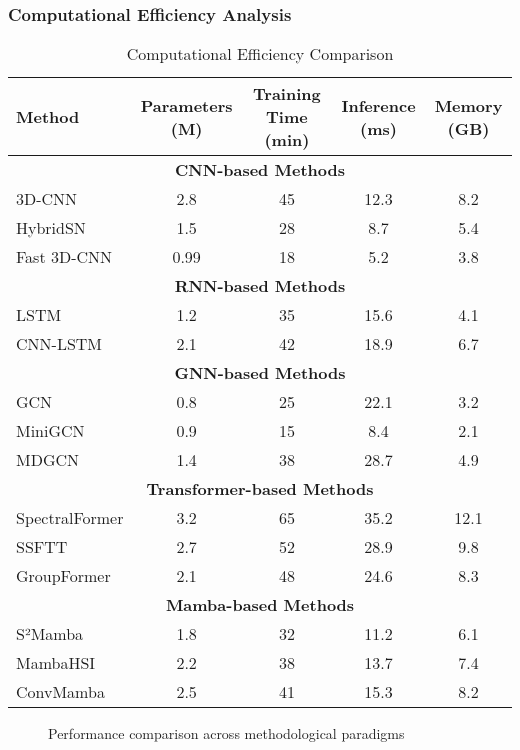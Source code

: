\documentclass[journal]{IEEEtran}
\begin{document}
\subsubsection{Computational Efficiency Analysis}

\begin{table}[!t]
\renewcommand{\arraystretch}{1.3}
\caption{Computational Efficiency Comparison}
\label{tab:efficiency_comparison}
\centering
\begin{tabular}{|l|c|c|c|c|}
\hline
\textbf{Method} & \textbf{Parameters (M)} & \textbf{Training Time (min)} & \textbf{Inference (ms)} & \textbf{Memory (GB)} \\
\hline
\multicolumn{5}{|c|}{\textbf{CNN-based Methods}} \\
\hline
3D-CNN & 2.8 & 45 & 12.3 & 8.2 \\
HybridSN & 1.5 & 28 & 8.7 & 5.4 \\
Fast 3D-CNN & 0.99 & 18 & 5.2 & 3.8 \\
\hline
\multicolumn{5}{|c|}{\textbf{RNN-based Methods}} \\
\hline
LSTM & 1.2 & 35 & 15.6 & 4.1 \\
CNN-LSTM & 2.1 & 42 & 18.9 & 6.7 \\
\hline
\multicolumn{5}{|c|}{\textbf{GNN-based Methods}} \\
\hline
GCN & 0.8 & 25 & 22.1 & 3.2 \\
MiniGCN & 0.9 & 15 & 8.4 & 2.1 \\
MDGCN & 1.4 & 38 & 28.7 & 4.9 \\
\hline
\multicolumn{5}{|c|}{\textbf{Transformer-based Methods}} \\
\hline
SpectralFormer & 3.2 & 65 & 35.2 & 12.1 \\
SSFTT & 2.7 & 52 & 28.9 & 9.8 \\
GroupFormer & 2.1 & 48 & 24.6 & 8.3 \\
\hline
\multicolumn{5}{|c|}{\textbf{Mamba-based Methods}} \\
\hline
S²Mamba & 1.8 & 32 & 11.2 & 6.1 \\
MambaHSI & 2.2 & 38 & 13.7 & 7.4 \\
ConvMamba & 2.5 & 41 & 15.3 & 8.2 \\
\hline
\end{tabular}
\end{table}
\begin{figure}[!t]
\centering
{}
\caption{Performance comparison across methodological paradigms}
\label{fig:performance_comparison}
\end{figure}
\end{document}
